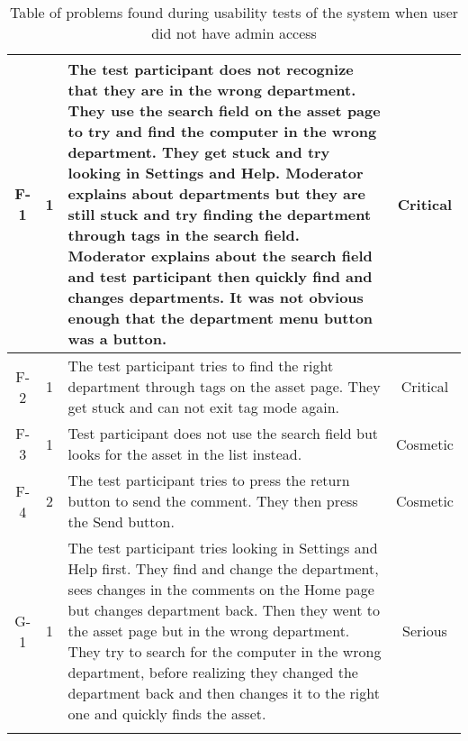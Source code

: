 \begin{longtable}{| c | c | p{8cm} | c |}
        F-1 & 1 & The test participant does not recognize that they are in the wrong department. They use the search field on the asset page to try and find the computer in the wrong department. They get stuck and try looking in Settings and Help. Moderator explains about departments but they are still stuck and try finding the department through tags in the search field. Moderator explains about the search field and test participant then quickly find and changes departments. It was not obvious enough that the department menu button was a button. & Critical
        \\
        \hline
        F-2 & 1 & The test participant tries to find the right department through tags on the asset page. They get stuck and can not exit tag mode again. &  Critical
        \\
        \hline
        F-3 & 1 & Test participant does not use the search field but looks for the asset in the list instead. & Cosmetic
        \\
        \hline
        F-4 & 2 & The test participant tries to press the return button to send the comment. They then press the Send button. & Cosmetic
        \\
        \hline
        G-1 & 1 & The test participant tries looking in Settings and Help first. They find and change the department, sees changes in the comments on the Home page but changes department back. Then they went to the asset page but in the wrong department. They try to search for the computer in the wrong department, before realizing they changed the department back and then changes it to the right one and quickly finds the asset. & Serious
        \\
        \hline
        
    \caption{Table of problems found during usability tests of the system when user did not have admin access}
    \label{tab:EmployeeProblems}
   
\end{longtable}